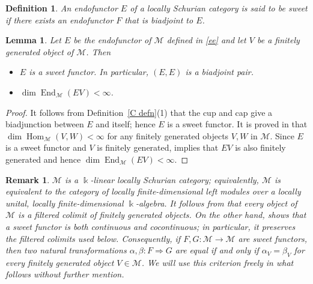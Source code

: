 \documentclass[a4,10pt]{amsart}
\numberwithin{equation}{section}
\def\dim{\text{dim}}
\def\k{\Bbbk}
\def\dim{\operatorname{dim}}
\def\Hom{\operatorname{Hom}}
\def\End{\operatorname{End}}
\newtheorem{Lemma}[Theorem]{Lemma}
\newtheorem{Defn}[Theorem]{Definition}
\newtheorem{rem}[Theorem]{Remark}
\theoremstyle{definition}
\newcommand{\old}[1]{{\color{red} #1}}
\begin{document}
\begin{Defn}\cite[p.7]{BD-cate}  An endofunctor $
E$  of a locally Schurian category is said to be sweet if there exists an endofunctor 
$
F$  that is biadjoint to 
$E$.\end{Defn} 

   
 \begin{Lemma}\label{biadj}   
  Let $E$ be the endofunctor of $\mathcal M$ defined in \eqref{ee} and let $V$ be a finitely generated object of $\mathcal M$.   Then \begin{itemize} \item[(1)]  $E$ is a sweet functor. In particular, $(E,E)$ is a  biadjoint pair. 
  \item [(2)]   $\dim \End_{\mathcal M}(EV)<\infty$.\end{itemize}  \end{Lemma}
 \begin{proof} It follows from Definition~\ref{C defn}(1)
 that the cup and cap give a biadjunction between $E$ and itself; hence $E$ is a sweet functor. It is proved in \cite[p.7]{BD-cate} that %
$\dim \Hom_{\mathcal M}(V, W)< \infty$ for any finitely generated objects $V, W$ in $\mathcal M$. Since $E$ is a sweet functor and $V$ is finitely generated, \cite[Theorem~2.11]{BD-cate} implies that  $EV$ is also finitely generated and hence  $\dim \End_{\mathcal M}(EV)<\infty$.\end{proof}

 


\begin{rem}\label{nateq}
\(\mathcal M\) is a \(\Bbbk\)-linear locally Schurian
category;  equivalently,  \(\mathcal M\) is equivalent to the
category of locally finite-dimensional left modules over a locally unital, locally finite-dimensional $\Bbbk$-algebra. It follows from
\cite[Lemma~2.6]{BS-semi} that every object of \(\mathcal M\) is a filtered
colimit of finitely generated objects. On the other hand,
\cite[Theorem~2.11]{BD-cate} shows that a sweet functor is both continuous
and cocontinuous; in particular, it preserves the filtered colimits used below.
Consequently, if \(F,G:\mathcal M\to\mathcal M\) are sweet functors, then
two natural transformations \(\alpha,\beta:F\Rightarrow G\) are equal if
and only if \(\alpha_V=\beta_V\) for every finitely generated object
\(V\in\mathcal M\). We will use this criterion freely in what follows
without further mention.
\end{rem}
\end{document}

